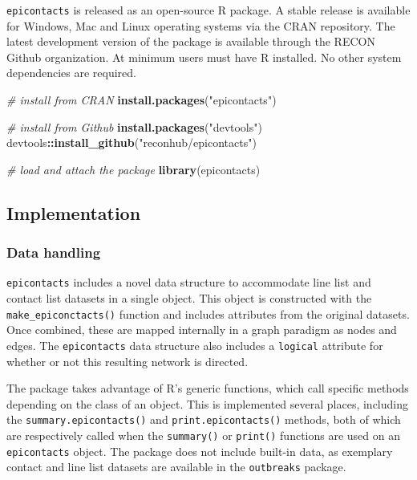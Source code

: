 \documentclass[9pt,a4paper,]{extarticle}
\newenvironment{Shaded}{\begin{snugshade}}{\end{snugshade}}
\newcommand{\KeywordTok}[1]{\textcolor[rgb]{0.13,0.29,0.53}{\textbf{#1}}}
\newcommand{\StringTok}[1]{\textcolor[rgb]{0.31,0.60,0.02}{#1}}
\newcommand{\CommentTok}[1]{\textcolor[rgb]{0.56,0.35,0.01}{\textit{#1}}}
\newcommand{\OperatorTok}[1]{\textcolor[rgb]{0.81,0.36,0.00}{\textbf{#1}}}
\newcommand{\NormalTok}[1]{#1}
\theoremstyle{definition}
\theoremstyle{definition}
\theoremstyle{definition}
\theoremstyle{remark}
\begin{document}
\texttt{epicontacts} is released as an open-source R package. A stable release is available for Windows, Mac and Linux operating systems via the CRAN repository. The latest development version of the package is available through the RECON Github organization. At minimum users must have R installed. No other system dependencies are required.

\begin{Shaded}
\begin{Highlighting}[]
\CommentTok{# install from CRAN}
\KeywordTok{install.packages}\NormalTok{(}\StringTok{"epicontacts"}\NormalTok{)}

\CommentTok{# install from Github}
\KeywordTok{install.packages}\NormalTok{(}\StringTok{"devtools"}\NormalTok{)}
\NormalTok{devtools}\OperatorTok{::}\KeywordTok{install_github}\NormalTok{(}\StringTok{"reconhub/epicontacts"}\NormalTok{)}
\end{Highlighting}
\end{Shaded}

\begin{Shaded}
\begin{Highlighting}[]
\CommentTok{# load and attach the package}
\KeywordTok{library}\NormalTok{(epicontacts)}
\end{Highlighting}
\end{Shaded}

\subsection{Implementation}\label{implementation}

\subsubsection{Data handling}\label{data-handling}

\texttt{epicontacts} includes a novel data structure to accommodate line list and contact list datasets in a single object. This object is constructed with the \texttt{make\_epiconctacts()} function and includes attributes from the original datasets. Once combined, these are mapped internally in a graph paradigm as nodes and edges. The \texttt{epicontacts} data structure also includes a \texttt{logical} attribute for whether or not this resulting network is directed.

The package takes advantage of R's generic functions, which call specific methods depending on the class of an object. This is implemented several places, including the \texttt{summary.epicontacts()} and \texttt{print.epicontacts()} methods, both of which are respectively called when the \texttt{summary()} or \texttt{print()} functions are used on an \texttt{epicontacts} object. The package does not include built-in data, as exemplary contact and line list datasets are available in the \texttt{outbreaks} package\citep{outbreaks}.
\end{document}
